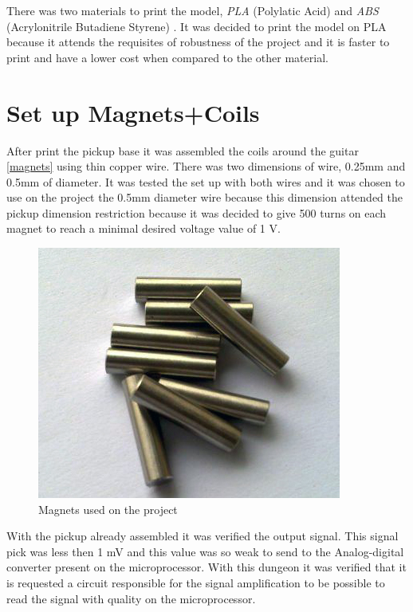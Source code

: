 There was two materials to print the model, \textit{PLA} (Polylatic Acid) \cite{3d-materials}
and \textit{ABS} (Acrylonitrile Butadiene Styrene) \cite{3d-materials}. It was decided to print
the model on PLA because it attends the requisites of robustness of the project and it is
faster to print and have a lower cost when compared to the other material.

\section{Set up Magnets+Coils}

After print the pickup base it was assembled the coils around the guitar \autoref{magnets}
using thin copper wire. There was two dimensions of wire, 0.25mm and 0.5mm of diameter. It was
tested the set up with both wires and it was chosen to use on the project the 0.5mm
diameter wire because this dimension attended the pickup dimension restriction because it was
decided to give 500 turns on each magnet to reach a minimal desired voltage value of 1 V.

\begin{figure}[!htpb]
\centering
\caption{Magnets used on the project}
\label{magnets}
\includegraphics[scale=0.3]{images/magnets}
\end{figure}

With the pickup already assembled it was verified the output signal. This signal
pick was less then 1 mV and this value was so weak to send to the Analog-digital
converter present on the microprocessor. With this dungeon it was verified that
it is requested a circuit responsible for the signal amplification to be possible to
read the signal with quality on the microprocessor.
